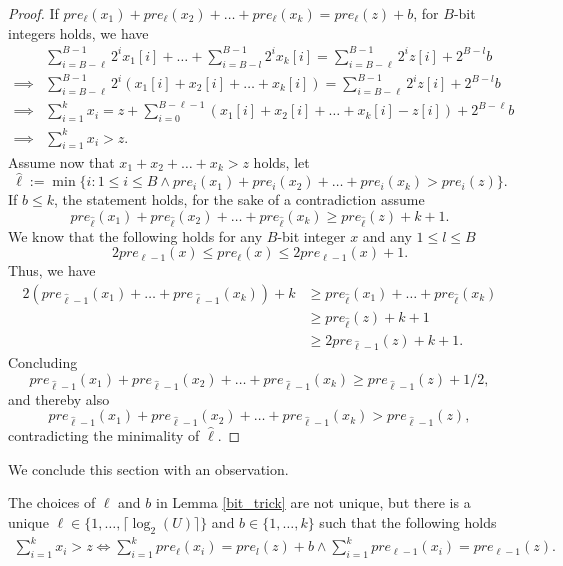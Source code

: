   \begin{proof}
    If  $pre_\ell(x_1)+pre_\ell(x_2)+ \dots +pre_\ell(x_k)=pre_\ell(z)+b$, for $B$-bit integers holds, we have
    \begin{align*}
       & \sum_{i=B-\ell}^{B-1}2^{i}x_{1}[i] + \dots +\sum_{i=B-l}^{B-1}2^{i}x_{k}[i]  = \sum_{i=B-\ell}^{B-1}2^{i}z[i]+2^{B-l}b \\
        \implies &\sum_{i=B-\ell}^{B-1}2^{i}(x_1[i]+x_2[i] +\dots + x_k[i]) =\sum_{i=B-\ell}^{B-1}2^{i}z[i]+2^{B-l}b\\
        \implies & \sum _{i=1}^k x_i=z+ \sum_{i=0}^{B-\ell-1}(x_1[i]+x_2[i] +\dots + x_k[i]-z[i])+2^{B-\ell}b\\
        \implies &\sum _{i=1}^k x_i >z.
    \end{align*}
    Assume now that $x_1+x_2 + \dots + x_k >z$ holds, let $$ \hat{\ell} :=\min\{i:1\leq i\leq B \land  pre_i(x_1)+pre_i(x_2)+\dots +pre_i(x_k)>pre_i(z)\}. $$ If $b \leq k$, the statement holds, for the sake of a contradiction assume $$pre_{\hat{\ell}}(x_1)+ pre_{\hat{\ell} }(x_2)+ \dots + pre_{\hat{\ell} }(x_k) \geq pre_{\hat{\ell} }(z)+k+1. $$
    We know that the following holds for any $B$-bit integer $x$ and any $1 \leq l\leq B$
    $$2pre_{\ell-1}(x) \leq pre_\ell(x) \leq 2pre_{\ell-1}(x)+1. $$
    Thus, we have
    \begin{align*}
        2\left(pre_{\hat{\ell} -1}(x_1)+ \dots + pre_{\hat{\ell} -1}(x_k)   \right) +k & \geq  pre_{\hat{\ell} }(x_1)+ \dots + pre_{\hat{\ell}}(x_k) \\
        & \geq pre_{\hat{\ell} } (z) +k +1\\
        & \geq 2pre_{\hat{\ell} -1}(z)+k+1 .
        \end{align*}
    Concluding $$ pre_{\hat{\ell} -1}(x_1)+ pre_{\hat{\ell} -1}(x_2)+ \dots + pre_{\hat{\ell} -1}(x_k)  \geq pre_{\hat{\ell} -1}(z) +1/2,$$ and thereby also
    $$ pre_{\hat{\ell} -1}(x_1)+ pre_{\hat{\ell} -1}(x_2)+ \dots + pre_{\hat{\ell} -1}(x_k)   > pre_{\hat{\ell} -1}(z), $$ contradicting the minimality of $\hat{\ell} $.
    \end{proof}
We conclude this section with an observation.
\begin{observation}
 The choices of $\ell$ and $b$ in Lemma \ref{bit_trick} are not unique, but there is a unique $\ell \in \{1,\dots, \lceil \log_2(U) \rceil \}$ and $b \in \{1,\dots,k\}$ such that the following holds
 \begin{align*}
  \sum_{i=1}^{k}x_i >z \iff \sum_{i=1}^{k}pre_\ell(x_i)=pre_l(z)+b \land \sum_{i=1}^{k}pre_{\ell-1}(x_i)=pre_{\ell-1}(z).
 \end{align*}
 \label{uniqueness_bit}
\end{observation}
